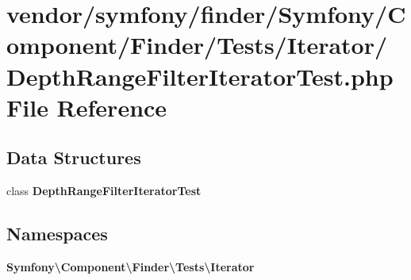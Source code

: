 \section{vendor/symfony/finder/\+Symfony/\+Component/\+Finder/\+Tests/\+Iterator/\+Depth\+Range\+Filter\+Iterator\+Test.php File Reference}
\label{_depth_range_filter_iterator_test_8php}
\subsection*{Data Structures}
\begin{DoxyCompactItemize}
\item 
class {\bf Depth\+Range\+Filter\+Iterator\+Test}
\end{DoxyCompactItemize}
\subsection*{Namespaces}
\begin{DoxyCompactItemize}
\item 
 {\bf Symfony\textbackslash{}\+Component\textbackslash{}\+Finder\textbackslash{}\+Tests\textbackslash{}\+Iterator}
\end{DoxyCompactItemize}
